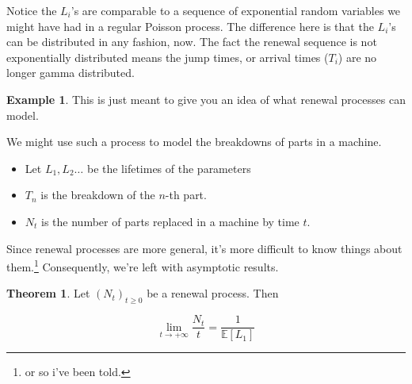 \documentclass[12pt]{article}
\theoremstyle{definition}
\newtheorem{theorem}{Theorem}[section]
\newtheorem{example}{Example}[section]
\begin{document}
Notice the $L_i$'s are comparable to a sequence of exponential random variables we might have had in a regular Poisson process. The difference here is that the $L_i$'s can be distributed in any fashion, now. The fact the renewal sequence is not exponentially distributed means the jump times, or arrival times ($T_i$) are no longer gamma distributed.

\begin{example}
  This is just meant to give you an idea of what renewal processes can model.

  We might use such a process to model the breakdowns of parts in a machine.
  \begin{itemize}
    \item Let $L_1, L_2 \dots $ be the lifetimes of the parameters
    \item $T_n$ is the breakdown of the $n$-th part.
    \item $N_t$ is the number of parts replaced in a machine by time $t$.
  \end{itemize}
\end{example}

Since renewal processes are more general, it's more difficult to know things about them.\footnote{or so i've been told.} Consequently, we're left with asymptotic results.

\begin{theorem}
  Let $(N_t)_{t \geq 0}$ be a renewal process. Then

  $$
\lim_{t \rightarrow + \infty} \frac{N_t}{t} = \frac{1}{\mathbb{E}[L_1]}
  $$
\end{theorem}
\end{document}
